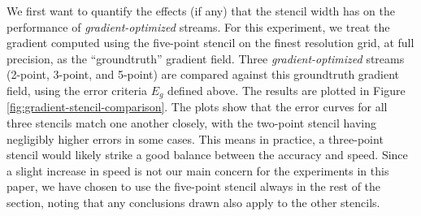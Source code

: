 We first want to quantify the effects (if any) that the stencil width has on the performance of
\emph{gradient-optimized} streams. For this experiment, we treat the gradient computed using the
five-point stencil on the finest resolution grid, at full precision, as the ``groundtruth'' gradient
field. Three \emph{gradient-optimized} streams (2-point, 3-point, and 5-point) are compared against
this groundtruth gradient field, using the error criteria $E_g$ defined above. The results are
plotted in Figure \ref{fig:gradient-stencil-comparison}. The plots show that the error curves for
all three stencils match one another closely, with the two-point stencil having negligibly higher
errors in some cases. This means in practice, a three-point stencil would likely strike a good
balance between the accuracy and speed. Since a slight increase in speed is not our main concern for
the experiments in this paper, we have chosen to use the five-point stencil always in the rest of
the section, noting that any conclusions drawn also apply to the other stencils.

